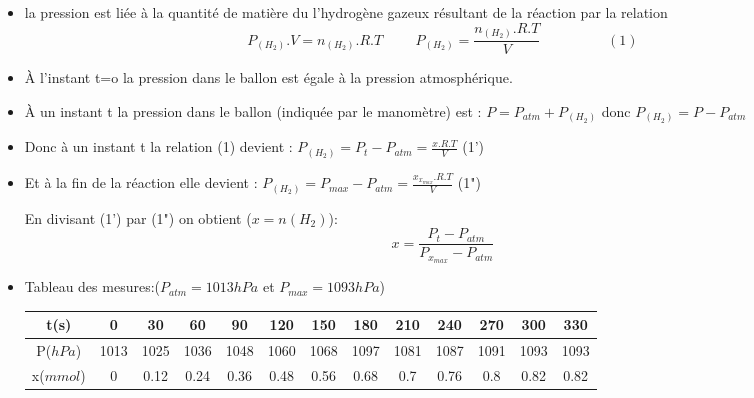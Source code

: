 \documentclass[12pt]{article}
\begin{document}
\begin{itemize}
	\item la pression est liée à la quantité de matière du l'hydrogène gazeux résultant de la réaction par la relation $${P}_{(H_2)}.V = n_{(H_2)}.R.T \hspace{1cm} P_{(H_2)} =\frac{n_{(H_2)}.R.T}{V} \hspace{2cm}  (1)$$

	\item À l'instant t=o la pression dans le ballon est égale à la pression atmosphérique.
	\item À un instant t la pression dans le ballon (indiquée par le manomètre) est : $P = P_{atm} + P_{(H_2)}$ donc $P_{(H_2)}= P-P_{atm}$

	\item Donc à un instant t la relation (1) devient : $ P_{(H_2)}= P_t-P_{atm} = \frac{x.R.T}{V}$ (1')

	\item Et à la fin de la réaction elle devient : $ P_{(H_2)}= P_{max}-P_{atm} = \frac{x_{x_{max}}.R.T}{V}$ (1")

	      En divisant (1') par (1") on obtient ($x = n(H_2)$): $$x = \frac{P_t-P_{atm}}{P_{x_{max}}-P_{atm}}$$

	\item Tableau des mesures:($P_{atm}=1013hPa$ et $P_{max}=1093hPa$)

	      \begin{center}
		      \begin{tabular}{|c|c|c|c|c|c|c|c|c|c|c|c|c|}
			      \hline
			      t(s)      & 0    & 30   & 60   & 90   & 120  & 150  & 180  & 210  & 240  & 270  & 300  & 330  \\\hline
			      P($hPa$)  & 1013 & 1025 & 1036 & 1048 & 1060 & 1068 & 1097 & 1081 & 1087 & 1091 & 1093 & 1093 \\\hline
			      x($mmol$) & 0    & 0.12 & 0.24 & 0.36 & 0.48 & 0.56 & 0.68 & 0.7  & 0.76 & 0.8  & 0.82 & 0.82 \\\hline
		      \end{tabular}
	      \end{center}




\end{itemize}
\end{document}
